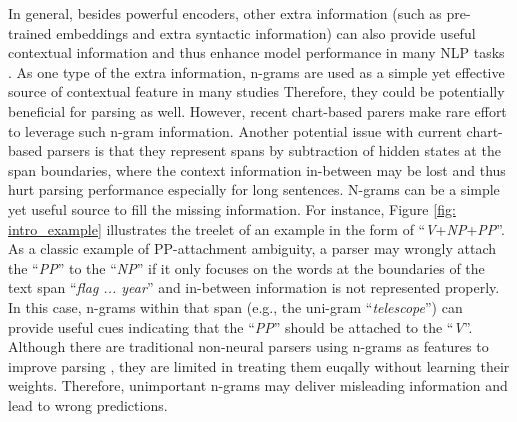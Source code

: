 \documentclass[11pt,a4paper]{article}
\begin{document}
In general, besides powerful encoders, other extra information (such as pre-trained embeddings and extra syntactic information) can also provide useful contextual information and thus enhance model performance in many NLP tasks \cite{pennington2014glove,song-etal-2018-joint,zhang-etal-2019-incorporating,mrini2019rethinking,tian-etal-2020-joint,tian-etal-2020-suppertagging}.
As one type of the extra information, n-grams are used as a simple yet effective source of contextual feature in many studies \cite{song-etal-2009-transliteration,song2012using,yoon-etal-2018-learning,tian2020improving}
Therefore, they could be potentially beneficial for parsing as well.
However, recent chart-based parers \cite{stern-etal-2017-minimal,kitaev-klein-2018-constituency,gaddy-etal-2018-whats,kitaev-etal-2019-multilingual,zhou-zhao-2019-head} make rare effort to leverage such n-gram information.
Another potential issue with current chart-based parsers is that they represent spans by subtraction of hidden states at the span boundaries, where the context information in-between may be lost and thus hurt parsing performance especially for long sentences.
N-grams can be a simple yet useful source to fill the missing information.
For instance, Figure \ref{fig: intro_example} illustrates the treelet of an example in the form of  ``\textit{V}+\textit{NP}+\textit{PP}''. As a classic example of PP-attachment ambiguity, a parser may wrongly attach the ``\textit{PP}'' to the ``\textit{NP}'' if it only focuses on the words at the boundaries of the text span ``\textit{flag ... year}'' and in-between information is not represented properly.
In this case, n-grams within that span (e.g., the uni-gram ``\textit{telescope}'') can provide useful cues indicating that the ``\textit{PP}'' should be attached to the ``\textit{V}''.
Although there are traditional non-neural parsers using n-grams as features to improve parsing \cite{sagae-lavie-2005-classifier,pitler-etal-2010-using}, they are limited in treating them euqally without learning their weights.
Therefore, unimportant n-grams may deliver misleading information and lead to wrong predictions.
\end{document}
